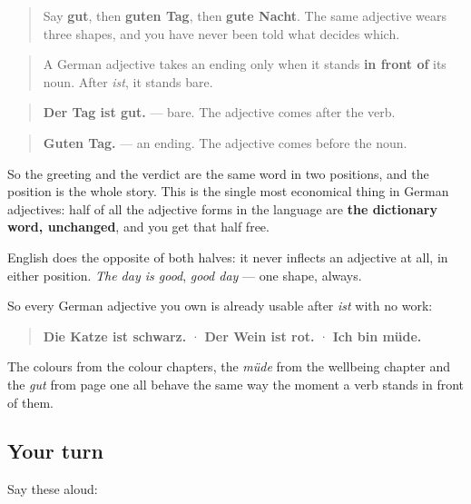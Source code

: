 \begin{quote}
Say \textbf{gut}, then \textbf{guten Tag}, then \textbf{gute Nacht}. The same adjective wears three shapes, and you have never been told what decides which.
\end{quote}

\begin{grammarlens}[title={Grammar Lens: the ending comes from standing in front}]
\begin{quote}
A German adjective takes an ending only when it stands \textbf{in front of} its noun. After \emph{ist}, it stands bare.
\end{quote}

\begin{quote}
\textbf{Der Tag ist gut.} — bare. The adjective comes after the verb.
\end{quote}

\begin{quote}
\textbf{Guten Tag.} — an ending. The adjective comes before the noun.
\end{quote}

So the greeting and the verdict are the same word in two positions, and the position is the whole story. This is the single most economical thing in German adjectives: half of all the adjective forms in the language are \textbf{the dictionary word, unchanged}, and you get that half free.
\end{grammarlens}

\begin{cousinweb}
English does the opposite of both halves: it never inflects an adjective at all, in either position. \emph{The day is good}, \emph{good day} — one shape, always.

So every German adjective you own is already usable after \emph{ist} with no work:

\begin{quote}
\textbf{Die Katze ist schwarz.} · \textbf{Der Wein ist rot.} · \textbf{Ich bin müde.}
\end{quote}

The colours from the colour chapters, the \emph{müde} from the wellbeing chapter and the \emph{gut} from page one all behave the same way the moment a verb stands in front of them.
\end{cousinweb}

\subsection*{Your turn}
Say these aloud:

